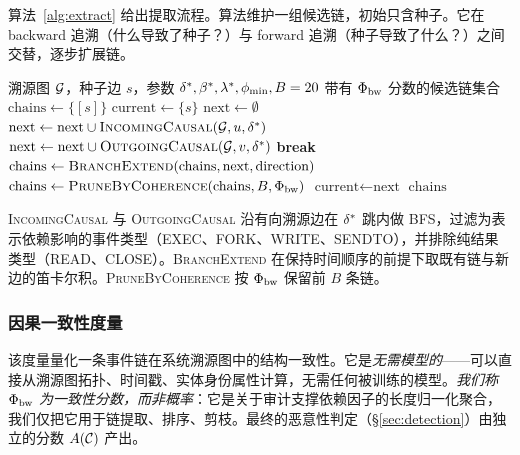 算法~\ref{alg:extract} 给出提取流程。算法维护一组候选链，初始只含种子。它在 backward 追溯（什么导致了种子？）与 forward 追溯（种子导致了什么？）之间交替，逐步扩展链。

\begin{algorithm}[t]
\caption{因果链提取}
\label{alg:extract}
\begin{algorithmic}[1]
\Require 溯源图 $\mathcal{G}$，种子边 $s$，参数 $\delta^*, \beta^*, \lambda^*, \phi_{\min}, B=20$
\Ensure 带有 $\Phi_{\text{bw}}$ 分数的候选链集合
\State $\text{chains} \gets \{ [s] \}$
\State $\text{current} \gets \{ s \}$
    \State $\text{next} \gets \emptyset$
        \State $\text{next} \gets \text{next} \cup \textsc{IncomingCausal}(\mathcal{G}, u, \delta^*)$
      \Else
        \State $\text{next} \gets \text{next} \cup \textsc{OutgoingCausal}(\mathcal{G}, v, \delta^*)$
      \EndIf
    \EndFor
     \State \textbf{break} 
    \EndIf
    \State $\text{chains} \gets \textsc{BranchExtend}(\text{chains}, \text{next}, \text{direction})$
      \State $\text{chains} \gets \textsc{PruneByCoherence}(\text{chains}, B, \Phi_{\text{bw}})$
    \EndIf
    \State $\text{current} \gets \text{next}$
  \EndFor
\EndFor
\State \Return $\text{chains}$
\end{algorithmic}
\end{algorithm}

\textsc{IncomingCausal} 与 \textsc{OutgoingCausal} 沿有向溯源边在 $\delta^*$ 跳内做 BFS，过滤为表示依赖影响的事件类型（EXEC、FORK、WRITE、SENDTO），并排除纯结果类型（READ、CLOSE）。\textsc{BranchExtend} 在保持时间顺序的前提下取既有链与新边的笛卡尔积。\textsc{PruneByCoherence} 按 $\Phi_{\text{bw}}$ 保留前 $B$ 条链。

\subsubsection{因果一致性度量}
\label{sec:metric_def}

该度量量化一条事件链在系统溯源图中的结构一致性。它是\emph{无需模型的}——可以直接从溯源图拓扑、时间戳、实体身份属性计算，无需任何被训练的模型。\emph{我们称 $\Phi_{\text{bw}}$ 为一致性分数，而非概率}：它是关于审计支撑依赖因子的长度归一化聚合，我们仅把它用于链提取、排序、剪枝。最终的恶意性判定（\S\ref{sec:detection}）由独立的分数 $A(\mathcal{C})$ 产出。

